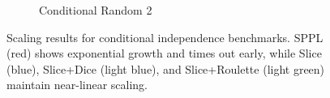 \begin{figure}[!t]
\begin{subfigure}{0.32\textwidth}
\caption{Conditional Random 2}
\label{fig:cond-benchmarks-c}
\end{subfigure}
\caption{Scaling results for conditional independence benchmarks. SPPL (red) shows exponential growth and times out early, while Slice (blue), Slice+Dice (light blue), and Slice+Roulette (light green) maintain near-linear scaling.}
\label{fig:cond-benchmarks}
\end{figure}